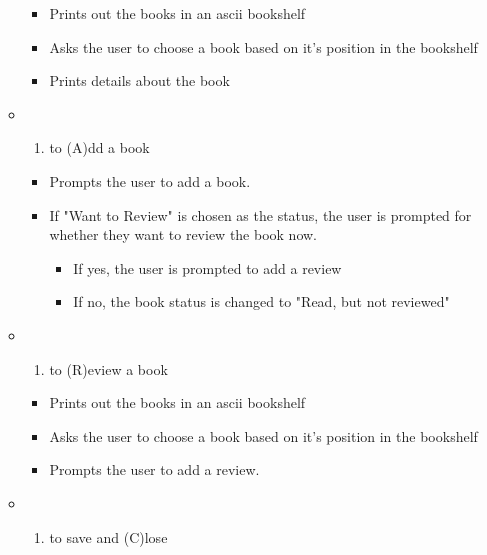 \documentclass[11pt]{article}
\providecommand{\tightlist}{%
      \setlength{\itemsep}{0pt}\setlength{\parskip}{0pt}}
\begin{document}
\begin{enumerate}
\begin{itemize}
    \begin{itemize}
    \tightlist
    \item
      Prints out the books in an ascii bookshelf
    \item
      Asks the user to choose a book based on it's position in the
      bookshelf
    \item
      Prints details about the book
    \end{itemize}
  \item
    \begin{enumerate}
    \def\labelenumii{(\Alph{enumii})}
    \tightlist
    \item
      to (A)dd a book
    \end{enumerate}

    \begin{itemize}
    \tightlist
    \item
      Prompts the user to add a book.
    \item
      If "Want to Review" is chosen as the status, the user is prompted
      for whether they want to review the book now.

      \begin{itemize}
      \tightlist
      \item
        If yes, the user is prompted to add a review
      \item
        If no, the book status is changed to "Read, but not reviewed"
      \end{itemize}
    \end{itemize}
  \item
    \begin{enumerate}
    \def\labelenumii{(\Alph{enumii})}
    \setcounter{enumii}{17}
    \tightlist
    \item
      to (R)eview a book
    \end{enumerate}

    \begin{itemize}
    \tightlist
    \item
      Prints out the books in an ascii bookshelf
    \item
      Asks the user to choose a book based on it's position in the
      bookshelf
    \item
      Prompts the user to add a review.
    \end{itemize}
  \item
    \begin{enumerate}
    \def\labelenumii{(\Alph{enumii})}
    \setcounter{enumii}{2}
    \tightlist
    \item
      to save and (C)lose
    \end{enumerate}


\end{itemize}
\end{enumerate}
\end{document}
